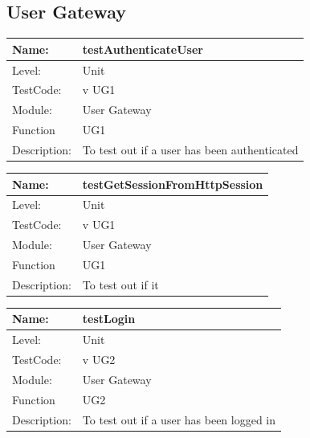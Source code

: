 \documentclass[12pt]{article}
\begin{document}
\subsection{User Gateway}
\begin{center}
\begin{tabular}{|l|p{12cm}|}
\hline

 Name: & testAuthenticateUser \\
\hline
Level: & Unit \\
\hline
TestCode: & v UG1 \\
\hline
Module:& User Gateway\\
\hline
Function & UG1 \\
\hline
Description: & To test out if a user has been authenticated \\
\hline

\end{tabular}
\end{center}

\begin{center}
\begin{tabular}{|l|p{12cm}|}
\hline

 Name: & testGetSessionFromHttpSession \\
\hline
Level: & Unit \\
\hline
TestCode: & v UG1 \\
\hline
Module:& User Gateway\\
\hline
Function & UG1 \\
\hline
Description: & To test out if it  \\
\hline

\end{tabular}
\end{center}

\begin{center}
\begin{tabular}{|l|p{12cm}|}
\hline

 Name: & testLogin\\
\hline
Level: & Unit \\
\hline
TestCode: & v UG2 \\
\hline
Module:& User Gateway\\
\hline
Function & UG2 \\
\hline
Description: & To test out if a user has been logged in \\
\hline

\end{tabular}
\end{center}
\end{document}
